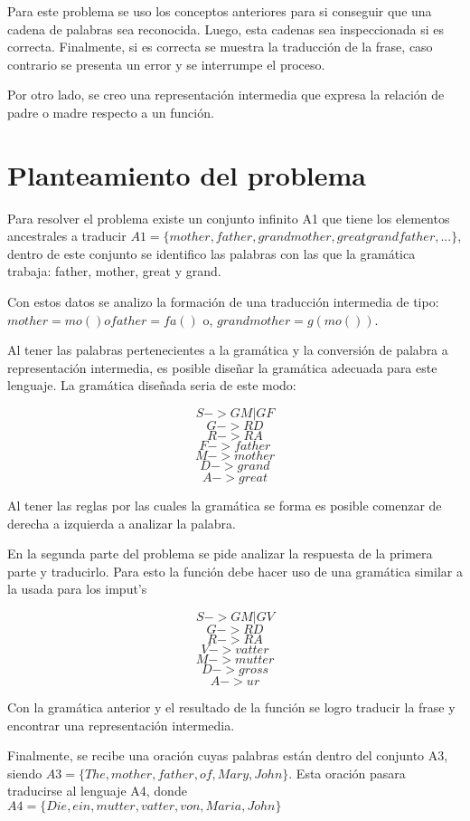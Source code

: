 \documentclass[conference]{IEEEtran}
\begin{document}
Para este problema se uso los conceptos anteriores para si conseguir que una cadena de palabras sea reconocida. Luego, esta cadenas sea inspeccionada si es correcta. Finalmente, si es correcta se muestra la traducci\'on de la frase, caso contrario se presenta un error y se interrumpe el proceso.

Por otro lado, se creo una representaci\'on intermedia que expresa la relaci\'on de padre o madre respecto a un funci\'on.

\section{Planteamiento del problema}

Para resolver el problema existe un conjunto infinito A1 que tiene los elementos ancestrales a traducir $A1 = \{mother, father, grandmother, greatgrandfather, ...\}$, 
dentro de este conjunto se identifico las palabras con las que la gram\'atica trabaja: father, mother, great y grand.

Con estos datos se analizo la formaci\'on de una traducci\'on intermedia de tipo:
$mother = mo() o father = fa()$ o,
$grandmother = g(mo())$. 

Al tener las palabras pertenecientes a la gram\'atica y la conversi\'on de palabra a representaci\'on intermedia, es posible diseñar la gram\'atica adecuada para este lenguaje. La gram\'atica diseñada seria de este modo:

$$S-> G M | G F  $$
$$G-> R D $$
$$R-> R A $$
$$F-> father$$
$$M-> mother$$
$$D-> grand$$
$$A-> great$$

Al tener las reglas por las cuales la gram\'atica se forma es posible comenzar de derecha a izquierda a analizar la palabra.

En la segunda parte del problema se pide analizar la respuesta de la primera parte y traducirlo. Para esto la funci\'on debe hacer uso de una gram\'atica similar a la usada para los imput's

$$S-> G M | G V  $$
$$G-> R D $$
$$R-> R A $$
$$V-> vatter$$
$$M-> mutter$$
$$D-> gross$$
$$A-> ur$$

Con la gram\'atica anterior y el resultado de la funci\'on se logro traducir la frase y encontrar una representaci\'on intermedia.

Finalmente, se recibe una oraci\'on cuyas palabras est\'an dentro del conjunto A3, siendo $A3 = \{The, mother, father, of, Mary, John \}$. Esta oraci\'on pasara traducirse al lenguaje A4, donde $A4 = \{Die, ein, mutter, vatter, von, Maria, John \}$
\end{document}
